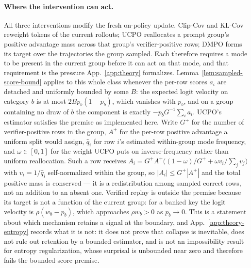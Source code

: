 \documentclass{article}
\newcommand{\1}{\mathbf 1}
\theoremstyle{remark}
\theoremstyle{definition}
\theoremstyle{plain}
\begin{document}
\paragraph{Where the intervention can act.}
All three interventions modify the fresh on-policy update. Clip-Cov and KL-Cov
reweight tokens of the current rollouts; UCPO reallocates a prompt group's
positive advantage mass across that group's verifier-positive rows; DMPO forms
its target over the trajectories the group sampled. Each therefore requires a
mode to be present in the current group before it can act on that mode, and
that requirement is the pressure App.~\ref{app:theory} formalizes.
Lemma~\ref{lem:sampled-score-bound} applies to this whole class whenever the
per-row scores $a_i$ are detached and uniformly bounded by some $B$: the
expected logit velocity on category $b$ is at most $2Bp_b(1-p_b)$, which
vanishes with $p_b$, and on a group containing no draw of $b$ the component is
exactly $-p_bG^{-1}\sum_i a_i$. UCPO's estimator satisfies the premise as
implemented here. Write $G^{+}$ for the number of verifier-positive rows in the
group, $A^{+}$ for the per-row positive advantage a uniform split would assign,
$\hat q_i$ for row $i$'s estimated within-group mode frequency, and
$\omega\in[0,1]$ for the weight UCPO puts on inverse-frequency rather than
uniform reallocation. Such a row receives
$A_i=G^{+}A^{+}\bigl((1-\omega)/G^{+}+\omega v_i/\sum_j v_j\bigr)$ with
$v_i=1/\hat q_i$ self-normalized within the group, so
$|A_i|\le G^{+}|A^{+}|$ and the total positive mass is conserved --- it is a
redistribution among sampled correct rows, not an addition to an absent one. Verified replay is outside the premise because its
target is not a function of the current group: for a banked key the logit
velocity is $\rho(w_b-p_b)$, which approaches $\rho w_b>0$ as $p_b\to0$. This
is a statement about which mechanism retains a signal at the boundary, and
App.~\ref{app:theory-entropy} records what it is not: it does not prove that
collapse is inevitable, does not rule out retention by a bounded estimator, and
is not an impossibility result for entropy regularization, whose surprisal is
unbounded near zero and therefore fails the bounded-score premise.
\end{document}

